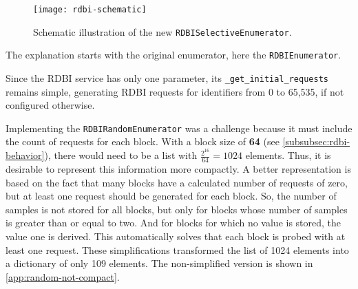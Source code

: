 \begin{figure}[htb]
    \centering
    \texttt{[image: rdbi-schematic]}
    \caption{Schematic illustration of the new \texttt{RDBISelectiveEnumerator}.}
    \label{fig:rdbi-schematic}
\end{figure}

The explanation starts with the original enumerator, here the \texttt{RDBIEnumerator}.


Since the RDBI service has only one parameter, its \texttt{_get_initial_requests} remains simple, generating RDBI requests for identifiers from 0 to 65,535, if not configured otherwise.

Implementing the \texttt{RDBIRandomEnumerator} was a challenge because it must include the count of requests for each block. With a block size of \textbf{64} (see \autoref{subsubsec:rdbi-behavior}), there would need to be a list with $\frac{2^{16}}{64} = 1024$ elements. Thus, it is desirable to represent this information more compactly. A better representation is based on the fact that many blocks have a calculated number of requests of zero, but at least one request should be generated for each block. So, the number of samples is not stored for all blocks, but only for blocks whose number of samples is greater than or equal to two. And for blocks for which no value is stored, the value one is derived. This automatically solves that each block is probed with at least one request. These simplifications transformed the list of 1024 elements into a dictionary of only 109 elements. The non-simplified version is shown in \autoref{app:random-not-compact}.

